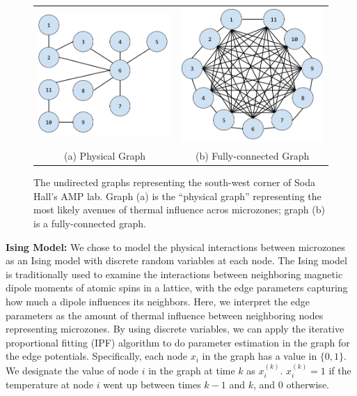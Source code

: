 \begin{figure}[ht]
\centering
\begin{tabular}{cc}
\includegraphics[width=.4\linewidth]{figs/SodaEdgeGraph} & \includegraphics[width=.4\linewidth]{figs/SodaFullEdgeGraph} \\
(a) Physical Graph  & (b) Fully-connected Graph \\[6pt]
\end{tabular}
\caption{The undirected graphs representing the south-west corner of Soda Hall's AMP lab. Graph (a) is the ``physical graph'' representing the most likely avenues of thermal influence acros microzones; graph (b) is a fully-connected graph.}
\label{fig:soda_edges}
\end{figure}

\textbf{Ising Model:} We chose to model the physical interactions between microzones as an Ising model with discrete random variables at each node.
The Ising model is traditionally used to examine the interactions between neighboring magnetic dipole moments of atomic spins in a lattice, with the edge parameters capturing how much a dipole influences its neighbors.
Here, we interpret the edge parameters as the amount of thermal influence between neighboring nodes representing microzones.
By using discrete variables, we can apply the iterative proportional fitting (IPF) algorithm to do parameter estimation in the graph for the edge potentials.
Specifically, each node $x_i$ in the graph has a value in $\lbrace 0, 1\rbrace$.
We designate the value of node $i$ in the graph at time $k$ as $x_i^{(k)}$.
$x_i^{(k)} = 1$ if the temperature at node $i$ went up between times $k-1$  and $k$, and 0 otherwise.


